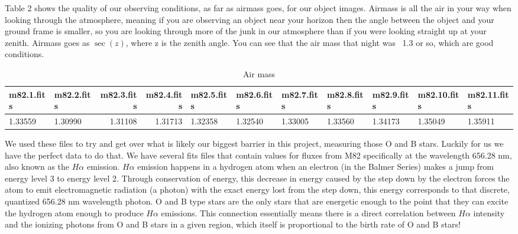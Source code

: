 \documentclass[modern]{aastex63}
\begin{document}
Table 2 shows the quality of our observing conditions, as far as airmass goes, for our object images. Airmass is all the air in your way when looking through the atmosphere, meaning if you are observing an object near your horizon then the angle between the object and your ground frame is smaller, so you are looking through more of the junk in our atmosphere than if you were looking straight up at your zenith. Airmass goes as $\sec(z)$, where z is the zenith angle. You can see that the air mass that night was ~1.3 or so, which are good conditions. \citep{1989ApOpt..28.4735K}

\begin{table}
\caption{Air mass}
\begin{tabular}{llrrl}
\toprule

m82.1.fits &    m82.2.fits &     m82.3.fits & m82.4.fits & m82.5.fits & m82.6.fits & m82.7.fits & m82.8.fits & m82.9.fits & m82.10.fits & m82.11.fits\\
\midrule

1.33559 & 1.30990 & 1.31108 & 1.31713 & 1.32358 & 1.32540 & 1.33005 & 1.33560 & 1.34173 & 1.35049 & 1.35911\\

 \bottomrule
\end{tabular}
\end{table}

We used these files to try and get over what is likely our biggest barrier in this project, measuring those O and B stars. Luckily for us we have the perfect data to do that. We have several fits files that contain values for fluxes from M82 specifically at the wavelength 656.28 nm, also known as the $H\alpha$ emission. $H\alpha$ emission happens in a hydrogen atom when an electron (in the Balmer Series) makes a jump from energy level 3 to energy level 2. Through conservation of energy, this decrease in energy caused by the step down by the electron forces the atom to emit electromagnetic radiation (a photon) with the exact energy lost from the step down, this energy corresponds to that discrete, quantized 656.28 nm wavelength photon. O and B type stars are the only stars that are energetic enough to the point that they can excite the hydrogen atom enough to produce $H\alpha$ emissions. This connection essentially means there is a direct correlation between $H\alpha$ intensity and the ionizing photons from O and B stars in a given region, which itself is proportional to the birth rate of O and B stars! 
\end{document}
